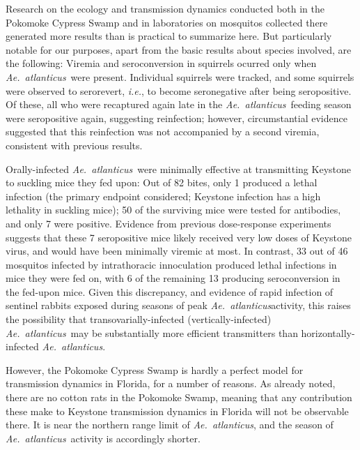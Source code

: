 \documentclass[12pt]{article}
\newcommand{\atl}{\textit{Ae.\ atlanticus}}
\newcommand{\ie}{\textit{i.e.}}
\newcommand{\cjh}{\textcolor{blue}{cjh}}
\newcommand{\msg}[3]{(#1 $\rightarrow$ #2: #3)}
\newcommand{\mcc}[1]{\msg\cjh\cjh{#1}}
\begin{document}
                Research on the ecology and transmission dynamics conducted both in the Pokomoke Cypress Swamp and in laboratories on mosquitos collected there generated more results than is practical to summarize here. But particularly notable for our purposes, apart from the basic results about species involved, are the following: Viremia and seroconversion in squirrels ocurred only when \atl\ were present.\cite{watts1988maintenance} Individual squirrels were tracked, and some squirrels were observed to serorevert, \ie, to become seronegative after being seropositive. Of these, all who were recaptured again late in the \atl\ feeding season were seropositive again, suggesting reinfection; however, circumstantial evidence suggested that this reinfection was not accompanied by a second viremia\cite{watts1988maintenance}, consistent with previous results\cite{watts1979experimental}.
                
                Orally-infected \atl\ were minimally effective at transmitting Keystone to suckling mice they fed upon: Out of 82 bites, only 1 produced a lethal infection (the primary endpoint considered; Keystone infection has a high lethality in suckling mice); 50 of the surviving mice were tested for antibodies, and only 7 were positive.\cite{watts1988maintenance} Evidence from previous dose-response experiments suggests that these 7 seropositive mice likely received very low doses of Keystone virus, and would have been minimally viremic at most. In contrast, 33 out of 46 mosquitos infected by intrathoracic innoculation produced lethal infections in mice they were fed on\cite{watts1988maintenance}, with 6 of the remaining 13 producing seroconversion in the fed-upon mice. Given this discrepancy, and evidence of rapid infection of sentinel rabbits exposed during seasons of peak \atl activity\cite{jennings1968california,leduc1978natural}, this raises the possibility that transovarially-infected (vertically-infected) \atl\ may be substantially more efficient transmitters than horizontally-infected \atl.
            

                However, the Pokomoke Cypress Swamp is hardly a perfect model for transmission dynamics in Florida, for a number of reasons. As already noted, there are no cotton rats in the Pokomoke Swamp, meaning that any contribution these make to Keystone transmission dynamics in Florida will not be observable there. It is near the northern range limit of \atl, and the season of \atl\ activity is accordingly shorter.
\end{document}
